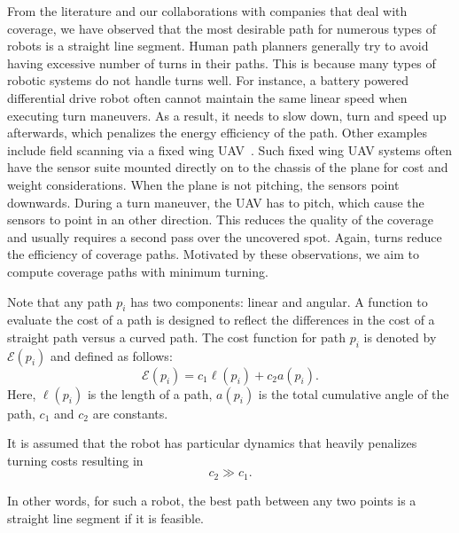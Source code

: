 \documentclass[../main.tex]{subfiles}
\begin{document}
From the literature and our collaborations with companies that deal with coverage, we have observed that the most desirable path for numerous types of robots is a straight line segment. Human path planners generally try to avoid having excessive number of turns in their paths. This is because many types of robotic systems do not handle turns well. For instance, a battery powered differential drive robot often cannot maintain the same linear speed when executing turn maneuvers. As a result, it needs to slow down, turn and speed up afterwards, which penalizes the energy efficiency of the path. Other examples include field scanning via a fixed wing UAV~\cite{frew2004vision}. Such fixed wing UAV systems often have the sensor suite mounted directly on to the chassis of the plane for cost and weight considerations. When the plane is not pitching, the sensors point downwards. During a turn maneuver, the UAV has to pitch, which cause the sensors to point in an other direction. This reduces the quality of the coverage and usually requires a second pass over the uncovered spot. Again, turns reduce the efficiency of coverage paths. Motivated by these observations, we aim to compute coverage paths with minimum turning. %

Note that any path $p_i$ has two components: linear and angular. A function to evaluate the cost of a path is designed to reflect the differences in the cost of a straight path versus a curved path. The cost function for path $p_i$ is denoted by $\mathcal{E}(p_i)$ and defined as follows:
\begin{equation}
	\mathcal{E}(p_i)=c_1\ell(p_i)+c_2a(p_i).
\end{equation}
Here, $\ell(p_i)$ is the length of a path, $a(p_i)$ is the total cumulative angle of the path, $c_1$ and $c_2$ are constants.

\begin{assumption}
It is assumed that the robot has particular dynamics that heavily penalizes turning costs resulting in
	\begin{equation}
		c_2 \gg c_1.
	\end{equation}
\end{assumption}
In other words, for such a robot, the best path between any two points is a straight line segment if it is feasible.
\end{document}

